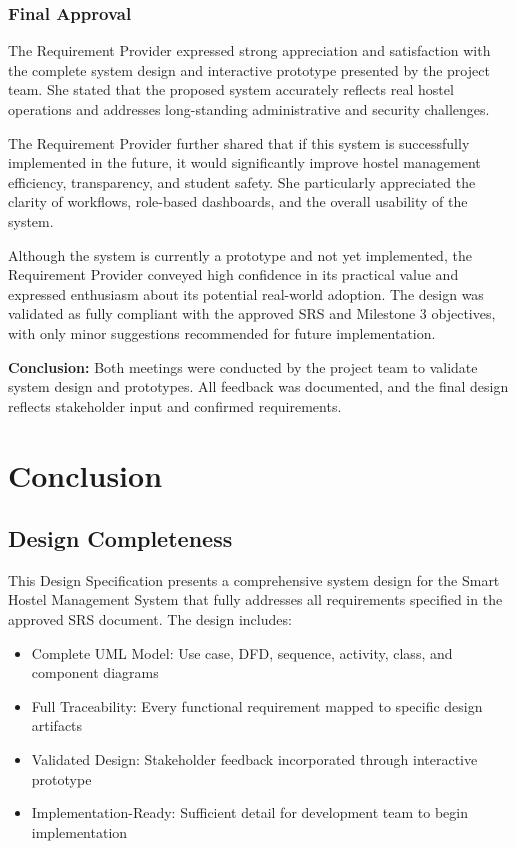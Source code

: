 \documentclass[12pt]{article}
\begin{document}
\subsubsection{Final Approval}
The Requirement Provider expressed strong appreciation and satisfaction with the complete system design and interactive prototype presented by the project team. She stated that the proposed system accurately reflects real hostel operations and addresses long-standing administrative and security challenges.

The Requirement Provider further shared that if this system is successfully implemented in the future, it would significantly improve hostel management efficiency, transparency, and student safety. She particularly appreciated the clarity of workflows, role-based dashboards, and the overall usability of the system.

Although the system is currently a prototype and not yet implemented, the Requirement Provider conveyed high confidence in its practical value and expressed enthusiasm about its potential real-world adoption. The design was validated as fully compliant with the approved SRS and Milestone 3 objectives, with only minor suggestions recommended for future implementation.

\textbf{Conclusion:}  
Both meetings were conducted by the project team to validate system design and prototypes. All feedback was documented, and the final design reflects stakeholder input and confirmed requirements.

\newpage
\section{Conclusion}

\subsection{Design Completeness}

This Design Specification presents a comprehensive system design for the Smart Hostel Management System that fully addresses all requirements specified in the approved SRS document. The design includes:

\begin{itemize}
\item Complete UML Model: Use case, DFD, sequence, activity, class, and component diagrams
\item Full Traceability: Every functional requirement mapped to specific design artifacts
\item Validated Design: Stakeholder feedback incorporated through interactive prototype
\item Implementation-Ready: Sufficient detail for development team to begin implementation
\end{itemize}
\end{document}
